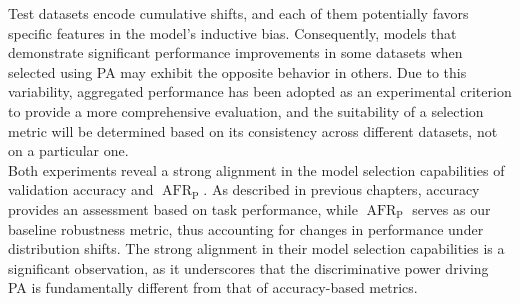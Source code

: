 Test datasets encode cumulative shifts, and each of them potentially favors specific features 
in the model's inductive bias. Consequently, models that demonstrate significant performance improvements 
in some datasets when selected using PA may exhibit the opposite behavior in others. Due to this variability, aggregated performance has been adopted as an experimental 
criterion to provide a more comprehensive evaluation, and the suitability of a selection metric will be
determined based on its consistency across different datasets, not on a particular one. \\

Both experiments reveal a strong alignment in the model selection capabilities of validation accuracy and 
$\operatorname{AFR}_{\text{P}}$. As described in previous chapters, accuracy provides an assessment based on 
task performance, while $\operatorname{AFR}_{\text{P}}$ serves as our baseline robustness metric, thus accounting for 
changes in performance under distribution shifts. The strong alignment in their model selection capabilities is a significant 
observation, as it underscores that the discriminative power driving PA is fundamentally different from that of 
accuracy-based metrics. \\

